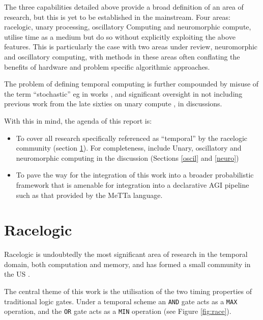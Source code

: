 \documentclass{article}
\begin{document}
The three capabilities detailed above provide a broad definition of an area of research, but this is yet to be established in the mainstream. Four areas: racelogic, unary processing, oscillatory Computing and neuromorphic compute, utilise time as a medium but do so without explicitly exploiting the above features. This is particularly the case with two areas under review, neuromorphic and oscillatory computing, with methods in these areas often conflating the benefits of hardware and problem specific algorithmic approaches.

The problem of defining temporal computing is further compounded by misuse of the term ``stochastic'' eg in works \cite{wu2020ugemm,wu2023power}, and significant oversight in not including previous work from the late sixties on unary compute \cite{POPPELBAUM198747}, in discussions.

With this in mind, the agenda of this report is:
\begin{itemize}
	\item To cover all research specifically referenced as ``temporal'' by the racelogic community (section \ref{race}). For completeness, include Unary, oscillatory and neuromorphic computing in the discussion (Sections \ref{oscil} and \ref{neuro})
	\item To pave the way for the integration of this work into a broader probabilistic framework that is amenable for integration into a declarative AGI pipeline such as that provided by the MeTTa language.
  	
\end{itemize}


\section{Racelogic} \label{race}
Racelogic is undoubtedly the most significant area of research in the temporal domain, both computation and memory, and has formed a small community in the US \cite{madhavan2014race}.

The central theme of this work is the utilisation of the two timing properties of traditional logic gates. Under a temporal scheme an \texttt{AND} gate acts as a \texttt{MAX} operation, and the \texttt{OR} gate acts as a \texttt{MIN} operation (see Figure \ref{fig:race}).
\end{document}
